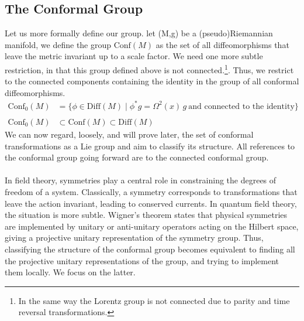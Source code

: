 \documentclass{article}
\begin{document}
\subsection{The Conformal Group}
Let us more formally define our group. let (M,g) be a (pseudo)Riemannian manifold, we define the group $\text{Conf}(M)$ as the set of all diffeomorphisms that leave the metric invariant up to a scale factor. We need one more subtle restriction, in that this group defined above is not connected.\footnote{In the same way the Lorentz group is not connected due to parity and time reversal transformations.}. Thus, we restrict to the connected components containing the identity in the group of all conformal diffeomorphisms.
\begin{equation}
\begin{aligned}
\text{Conf}_0(M) &= \{ \phi \in \mathrm{Diff}(M) \mid \phi^*g = \Omega^2(x)\, g \ \text{and connected to the identity} \} \\\\
\text{Conf}_0(M) &\subset \text{Conf}(M) \subset \mathrm{Diff}(M)
\end{aligned}
\end{equation} 
We can now regard, loosely, and will prove later, the set of conformal transformations as a Lie group and aim to classify its structure. All references to the conformal group going forward are to the connected conformal group.\\\\
In field theory, symmetries play a central role in constraining the degrees of freedom of a system. Classically, a symmetry corresponds to transformations that leave the action invariant, leading to conserved currents. In quantum field theory, the situation is more subtle. Wigner’s theorem states that physical symmetries are implemented by unitary or anti-unitary operators acting on the Hilbert space, giving a projective unitary representation of the symmetry group. Thus, classifying the structure of the conformal group becomes equivalent to finding all the projective unitary representations of the group, and trying to implement them locally. We focus on the latter. 
\end{document}
